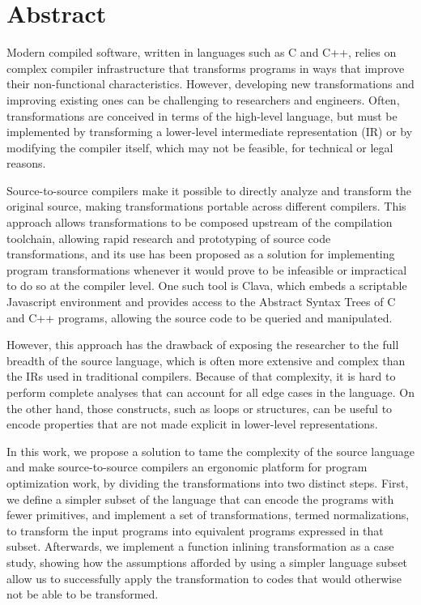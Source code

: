 \chapter*{Abstract}

Modern compiled software, written in languages such as C and C++, relies on complex compiler infrastructure that transforms programs in ways that improve their non-functional characteristics. However, developing new transformations and improving existing ones can be challenging to researchers and engineers. Often, transformations are conceived in terms of the high-level language, but must be implemented by transforming a lower-level intermediate representation (IR) or by modifying the compiler itself, which may not be feasible, for technical or legal reasons.

Source-to-source compilers make it possible to directly analyze and transform the original source, making transformations portable across different compilers. This approach allows transformations to be composed upstream of the compilation toolchain, allowing rapid research and prototyping of source code transformations, and its use has been proposed as a solution for implementing program transformations whenever it would prove to be infeasible or impractical to do so at the compiler level. One such tool is Clava, which embeds a scriptable Javascript environment and provides access to the Abstract Syntax Trees of C and C++ programs, allowing the source code to be queried and manipulated.

However, this approach has the drawback of exposing the researcher to the full breadth of the source language, which is often more extensive and complex than the IRs used in traditional compilers. Because of that complexity, it is hard to perform complete analyses that can account for all edge cases in the language. On the other hand, those constructs, such as loops or structures, can be useful to encode properties that are not made explicit in lower-level representations.

In this work, we propose a solution to tame the complexity of the source language and make source-to-source compilers an ergonomic platform for program optimization work, by dividing the transformations into two distinct steps. First, we define a simpler subset of the language that can encode the programs with fewer primitives, and implement a set of transformations, termed normalizations, to transform the input programs into equivalent programs expressed in that subset. Afterwards, we implement a function inlining transformation as a case study, showing how the assumptions afforded by using a simpler language subset allow us to successfully apply the transformation to codes that would otherwise not be able to be transformed.

